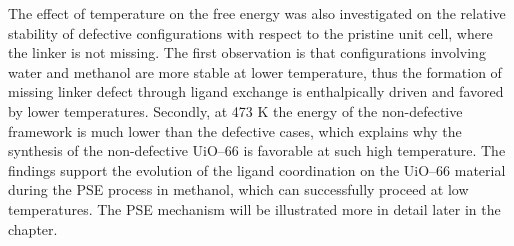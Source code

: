 \npar
The effect of temperature on the free energy was also investigated on the relative stability of defective configurations with respect to the pristine unit cell, where the linker is not missing. The first observation is that configurations involving water and methanol are more stable at lower temperature, thus the formation of missing linker defect through ligand exchange is enthalpically driven and favored by lower temperatures. Secondly, at 473 K the energy of the non-defective framework is much lower than the defective cases, which explains why the synthesis of the non-defective UiO--66 is favorable at such high temperature\cite{shearer2014tuned}. 
\npar
The findings support the evolution of the ligand coordination on the UiO--66 material during the PSE process in methanol, which can successfully proceed at low temperatures. The PSE mechanism will be illustrated more in detail later in the chapter.

